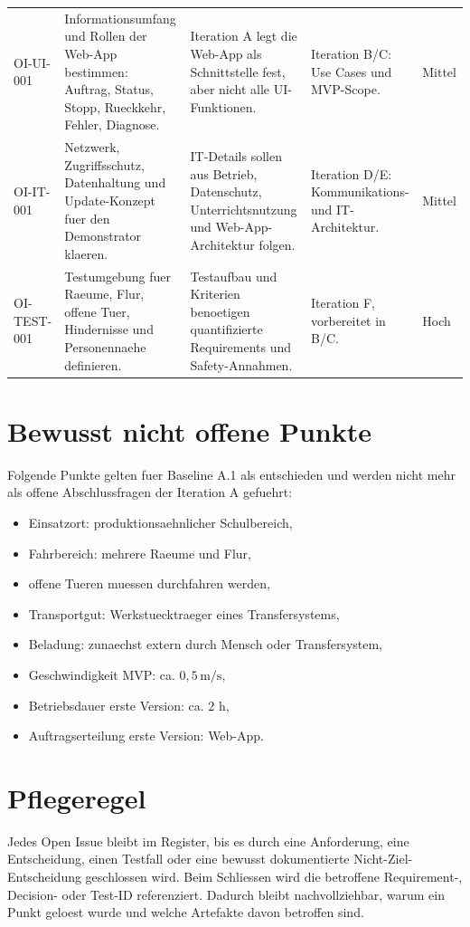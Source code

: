 \begin{longtable}{L{0.13\textwidth} L{0.30\textwidth} L{0.22\textwidth} L{0.17\textwidth} L{0.08\textwidth}}
OI-UI-001 & Informationsumfang und Rollen der Web-App bestimmen: Auftrag, Status, Stopp, Rueckkehr, Fehler, Diagnose. & Iteration A legt die Web-App als Schnittstelle fest, aber nicht alle UI-Funktionen. & Iteration B/C: Use Cases und MVP-Scope. & Mittel \\
OI-IT-001 & Netzwerk, Zugriffsschutz, Datenhaltung und Update-Konzept fuer den Demonstrator klaeren. & IT-Details sollen aus Betrieb, Datenschutz, Unterrichtsnutzung und Web-App-Architektur folgen. & Iteration D/E: Kommunikations- und IT-Architektur. & Mittel \\
OI-TEST-001 & Testumgebung fuer Raeume, Flur, offene Tuer, Hindernisse und Personennaehe definieren. & Testaufbau und Kriterien benoetigen quantifizierte Requirements und Safety-Annahmen. & Iteration F, vorbereitet in B/C. & Hoch \\
\bottomrule
\end{longtable}

\section{Bewusst nicht offene Punkte}

Folgende Punkte gelten fuer Baseline A.1 als entschieden und werden nicht mehr als offene Abschlussfragen der Iteration A gefuehrt:
\begin{itemize}
  \item Einsatzort: produktionsaehnlicher Schulbereich,
  \item Fahrbereich: mehrere Raeume und Flur,
  \item offene Tueren muessen durchfahren werden,
  \item Transportgut: Werkstuecktraeger eines Transfersystems,
  \item Beladung: zunaechst extern durch Mensch oder Transfersystem,
  \item Geschwindigkeit MVP: ca. $0{,}5\,\mathrm{m/s}$,
  \item Betriebsdauer erste Version: ca. 2 h,
  \item Auftragserteilung erste Version: Web-App.
\end{itemize}

\section{Pflegeregel}

Jedes Open Issue bleibt im Register, bis es durch eine Anforderung, eine Entscheidung, einen Testfall oder eine bewusst dokumentierte Nicht-Ziel-Entscheidung geschlossen wird. Beim Schliessen wird die betroffene Requirement-, Decision- oder Test-ID referenziert. Dadurch bleibt nachvollziehbar, warum ein Punkt geloest wurde und welche Artefakte davon betroffen sind.
